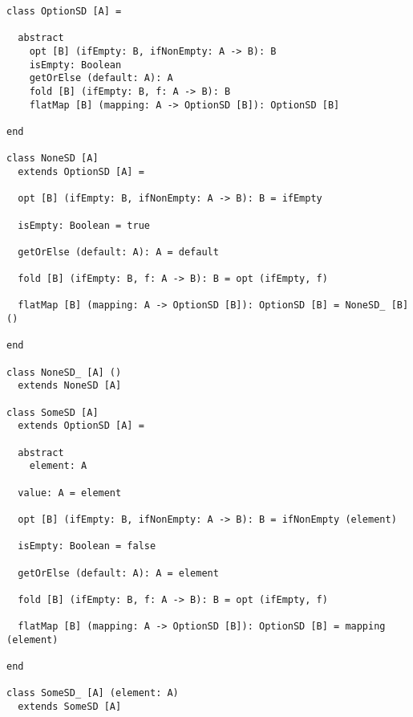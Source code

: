 \begin{lstlisting}[label={lst:option}]
class OptionSD [A] =

  abstract
    opt [B] (ifEmpty: B, ifNonEmpty: A -> B): B
    isEmpty: Boolean
    getOrElse (default: A): A
    fold [B] (ifEmpty: B, f: A -> B): B
    flatMap [B] (mapping: A -> OptionSD [B]): OptionSD [B]

end

class NoneSD [A]
  extends OptionSD [A] =

  opt [B] (ifEmpty: B, ifNonEmpty: A -> B): B = ifEmpty

  isEmpty: Boolean = true

  getOrElse (default: A): A = default

  fold [B] (ifEmpty: B, f: A -> B): B = opt (ifEmpty, f)

  flatMap [B] (mapping: A -> OptionSD [B]): OptionSD [B] = NoneSD_ [B] ()

end

class NoneSD_ [A] ()
  extends NoneSD [A]

class SomeSD [A]
  extends OptionSD [A] =

  abstract
    element: A

  value: A = element

  opt [B] (ifEmpty: B, ifNonEmpty: A -> B): B = ifNonEmpty (element)

  isEmpty: Boolean = false

  getOrElse (default: A): A = element

  fold [B] (ifEmpty: B, f: A -> B): B = opt (ifEmpty, f)

  flatMap [B] (mapping: A -> OptionSD [B]): OptionSD [B] = mapping (element)

end

class SomeSD_ [A] (element: A)
  extends SomeSD [A]
\end{lstlisting}

